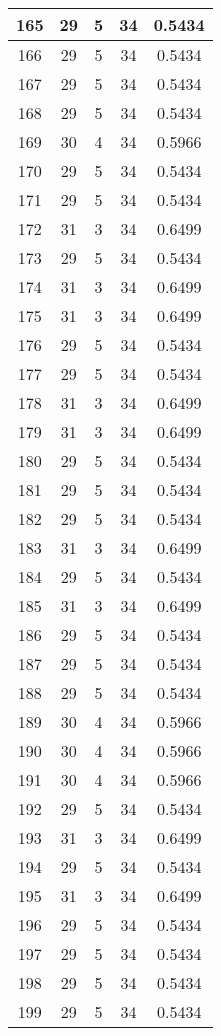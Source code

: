 \documentclass[letterpaper, 12pt]{article}
\begin{document}
\begin{longtable}{|c|c|c|c|c|}
\hline
165 & 29 & 5 & 34 & 0.5434 \\
\hline
166 & 29 & 5 & 34 & 0.5434 \\
\hline
167 & 29 & 5 & 34 & 0.5434 \\
\hline
168 & 29 & 5 & 34 & 0.5434 \\
\hline
169 & 30 & 4 & 34 & 0.5966 \\
\hline
170 & 29 & 5 & 34 & 0.5434 \\
\hline
171 & 29 & 5 & 34 & 0.5434 \\
\hline
172 & 31 & 3 & 34 & 0.6499 \\
\hline
173 & 29 & 5 & 34 & 0.5434 \\
\hline
174 & 31 & 3 & 34 & 0.6499 \\
\hline
175 & 31 & 3 & 34 & 0.6499 \\
\hline
176 & 29 & 5 & 34 & 0.5434 \\
\hline
177 & 29 & 5 & 34 & 0.5434 \\
\hline
178 & 31 & 3 & 34 & 0.6499 \\
\hline
179 & 31 & 3 & 34 & 0.6499 \\
\hline
180 & 29 & 5 & 34 & 0.5434 \\
\hline
181 & 29 & 5 & 34 & 0.5434 \\
\hline
182 & 29 & 5 & 34 & 0.5434 \\
\hline
183 & 31 & 3 & 34 & 0.6499 \\
\hline
184 & 29 & 5 & 34 & 0.5434 \\
\hline
185 & 31 & 3 & 34 & 0.6499 \\
\hline
186 & 29 & 5 & 34 & 0.5434 \\
\hline
187 & 29 & 5 & 34 & 0.5434 \\
\hline
188 & 29 & 5 & 34 & 0.5434 \\
\hline
189 & 30 & 4 & 34 & 0.5966 \\
\hline
190 & 30 & 4 & 34 & 0.5966 \\
\hline
191 & 30 & 4 & 34 & 0.5966 \\
\hline
192 & 29 & 5 & 34 & 0.5434 \\
\hline
193 & 31 & 3 & 34 & 0.6499 \\
\hline
194 & 29 & 5 & 34 & 0.5434 \\
\hline
195 & 31 & 3 & 34 & 0.6499 \\
\hline
196 & 29 & 5 & 34 & 0.5434 \\
\hline
197 & 29 & 5 & 34 & 0.5434 \\
\hline
198 & 29 & 5 & 34 & 0.5434 \\
\hline
199 & 29 & 5 & 34 & 0.5434 \\
\hline
\end{longtable}
\end{document}
